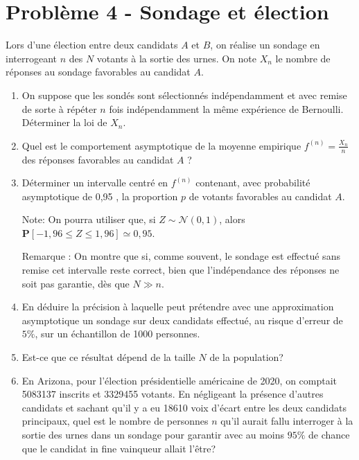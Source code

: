 \documentclass[10pt]{article}
\begin{document}
\section*{Problème 4 - Sondage et élection}
Lors d'une élection entre deux candidats $A$ et $B$, on réalise un sondage en interrogeant $n$ des $N$ votants à la sortie des urnes. On note $X_n$ le nombre de réponses au sondage favorables au candidat $A$.
\begin{enumerate}
    \item On suppose que les sondés sont sélectionnés indépendamment et avec remise de sorte à répéter $n$ fois indépendamment la même expérience de Bernoulli. Déterminer la loi de $X_n$.
    \item Quel est le comportement asymptotique de la moyenne empirique $f^{(n)}=\frac{X_n}{n}$ des réponses favorables au candidat $A$ ?
    \item Déterminer un intervalle centré en $f^{(n)}$ contenant, avec probabilité asymptotique de 0,95 , la proportion $p$ de votants favorables au candidat $A$.
    
    Note: On pourra utiliser que, si $Z \sim \mathcal{N}(0,1)$, alors $\mathbf{P}[-1,96 \leq Z \leq 1,96] \simeq 0,95$.
    
    Remarque : On montre que si, comme souvent, le sondage est effectué sans remise cet intervalle reste correct, bien que l'indépendance des réponses ne soit pas garantie, dès que $N \gg n$.
    
    \item En déduire la précision à laquelle peut prétendre avec une approximation asymptotique un sondage sur deux candidats effectué, au risque d'erreur de $5 \%$, sur un échantillon de 1000 personnes.
    \item Est-ce que ce résultat dépend de la taille $N$ de la population?
    \item En Arizona, pour l'élection présidentielle américaine de 2020, on comptait 5083137 inscrits et 3329455 votants. En négligeant la présence d'autres candidats et sachant qu'il y a eu 18610 voix d'écart entre les deux candidats principaux, quel est le nombre de personnes $n$ qu'il aurait fallu interroger à la sortie des urnes dans un sondage pour garantir avec au moins $95 \%$ de chance que le candidat in fine vainqueur allait l'être?
\end{enumerate}
\end{document}
